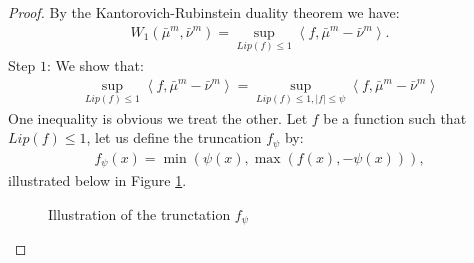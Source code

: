 \documentclass[11pt,a4paper]{article}
\newcommand{\brac}[1]{\left\langle#1\right\rangle}
\begin{document}
\begin{proof}
    By the Kantorovich-Rubinstein duality theorem we have:
    \begin{align*}
        W_1(\bar{\mu}^m,\bar{\nu}^m) = \sup\limits_{Lip(f) \leq 1} \brac{f,\bar{\mu}^m - \bar{\nu}^m} .
    \end{align*}
    Step $1$: We show that:
    \begin{align*}
        \sup\limits_{Lip(f) \leq 1} \brac{f,\bar{\mu}^m - \bar{\nu}^m} = \sup\limits_{Lip(f) \leq 1,|f| \leq \psi} \brac{f,\bar{\mu}^m - \bar{\nu}^m}
    \end{align*}
    One inequality is obvious we treat the other. Let $f$ be a function such that $Lip(f) \leq 1$, let us define the truncation $f_\psi$ by:
    \begin{align*}
        f_\psi(x) = \min(\psi(x),\max(f(x),-\psi(x))),
    \end{align*}
    illustrated below in Figure \ref{fig:illustration-of-truncation}.
    \begin{center}
  \begin{figure}[h]
    \centering
    \pgfplotsset{compat=1.18}
    \caption{Illustration of the trunctation $f_\psi$}
    \label{fig:illustration-of-truncation}
  \end{figure}
  \begin{figure}[ht]
\centering


\end{figure}
\end{center}
\end{proof}
\end{document}
